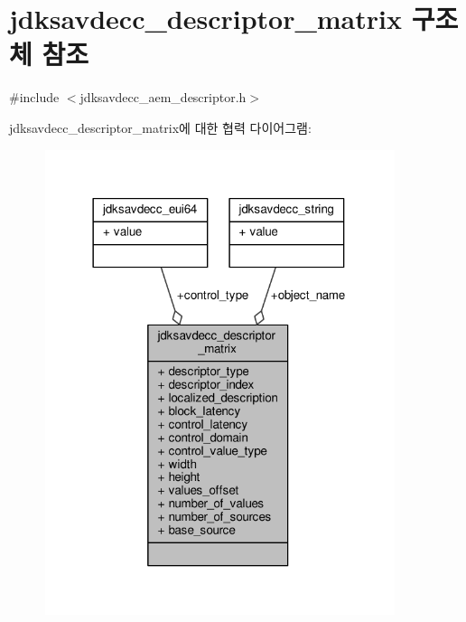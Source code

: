 \hypertarget{structjdksavdecc__descriptor__matrix}{}\section{jdksavdecc\+\_\+descriptor\+\_\+matrix 구조체 참조}
\label{structjdksavdecc__descriptor__matrix}


{\ttfamily \#include $<$jdksavdecc\+\_\+aem\+\_\+descriptor.\+h$>$}



jdksavdecc\+\_\+descriptor\+\_\+matrix에 대한 협력 다이어그램\+:
\nopagebreak
\begin{figure}[H]
\begin{center}
\leavevmode
\includegraphics[width=290pt]{structjdksavdecc__descriptor__matrix__coll__graph}
\end{center}
\end{figure}
